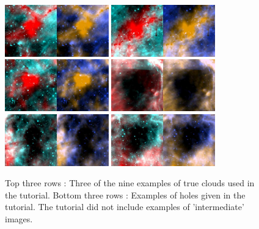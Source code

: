 \documentclass[a4,useAMS,usenatbib]{mn2e}
\begin{document}
\begin{figure}
\includegraphics[angle=0,width=0.4\textwidth]{./images/website_examples/cloud1.jpg}
\includegraphics[angle=0,width=0.4\textwidth]{./images/website_examples/cloud2.jpg}
\includegraphics[angle=0,width=0.4\textwidth]{./images/website_examples/cloud3.jpg}
\includegraphics[angle=0,width=0.4\textwidth]{./images/website_examples/hole1.jpg}
\includegraphics[angle=0,width=0.4\textwidth]{./images/website_examples/hole2.jpg}
\includegraphics[angle=0,width=0.4\textwidth]{./images/website_examples/hole3.jpg}
\caption{Top three rows : Three of the nine examples of true clouds used in the tutorial. Bottom three rows : Examples of holes given in the tutorial. The tutorial did not include examples of 'intermediate' images.}\label{fig:ex}
\end{figure}
\end{document}
